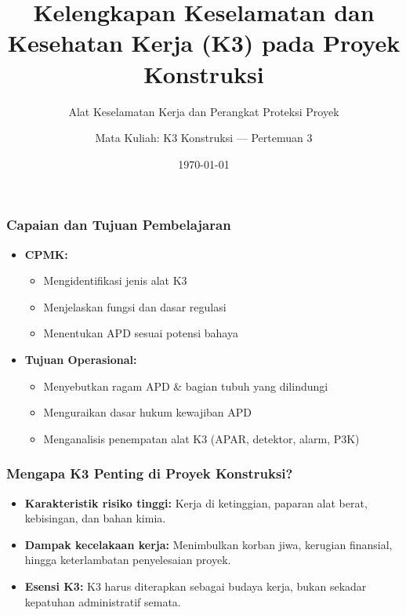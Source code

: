 \documentclass[../main.tex]{subfiles}
\title{Kelengkapan Keselamatan dan Kesehatan Kerja (K3) pada Proyek Konstruksi}
\subtitle{Alat Keselamatan Kerja dan Perangkat Proteksi Proyek}
\author{Mata Kuliah: K3 Konstruksi --- Pertemuan 3}
\institute{Dosen Pengampu}
\date{\today}
\begin{document}
\begin{frame}[c, mytitle=center, mycolor=digiPH_darkblue, dark]
	\titlepage
\end{frame}

\begin{frame}[t, mytitle=standard]
	\frametitle{Capaian dan Tujuan Pembelajaran}
	\begin{itemize}
		\item \textbf{CPMK:}
		      \begin{itemize}
			      \item Mengidentifikasi jenis alat K3
			      \item Menjelaskan fungsi dan dasar regulasi
			      \item Menentukan APD sesuai potensi bahaya
		      \end{itemize}
		      \vspace{0.5cm}
		\item \textbf{Tujuan Operasional:}
		      \begin{itemize}
			      \item Menyebutkan ragam APD \& bagian tubuh yang dilindungi
			      \item Menguraikan dasar hukum kewajiban APD
			      \item Menganalisis penempatan alat K3 (APAR, detektor, alarm, P3K)
		      \end{itemize}
	\end{itemize}
\end{frame}

\begin{frame}[c, mytitle=center, mycolor=digiPH_gray]
	\frametitle{Mengapa K3 Penting di Proyek Konstruksi?}
	\begin{itemize}
		\item \textbf{Karakteristik risiko tinggi:} Kerja di ketinggian, paparan alat berat, kebisingan, dan bahan kimia.
		\item \textbf{Dampak kecelakaan kerja:} Menimbulkan korban jiwa, kerugian finansial, hingga keterlambatan penyelesaian proyek.
		\item \textbf{Esensi K3:} K3 harus diterapkan sebagai budaya kerja, bukan sekadar kepatuhan administratif semata.
	\end{itemize}
\end{frame}
\end{document}

